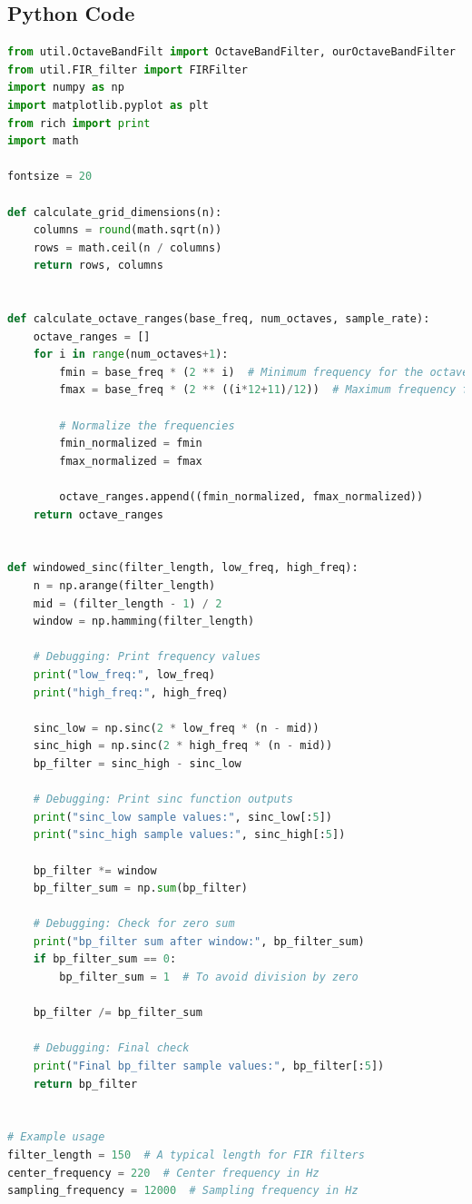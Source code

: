 \documentclass[a4paper, 11pt]{exam}
\begin{document}
\subsection{Python Code}
\begin{lstlisting}[language=Python]
from util.OctaveBandFilt import OctaveBandFilter, ourOctaveBandFilter
from util.FIR_filter import FIRFilter
import numpy as np
import matplotlib.pyplot as plt
from rich import print
import math

fontsize = 20

def calculate_grid_dimensions(n):
    columns = round(math.sqrt(n))
    rows = math.ceil(n / columns)
    return rows, columns


def calculate_octave_ranges(base_freq, num_octaves, sample_rate):
    octave_ranges = []
    for i in range(num_octaves+1):
        fmin = base_freq * (2 ** i)  # Minimum frequency for the octave
        fmax = base_freq * (2 ** ((i*12+11)/12))  # Maximum frequency for the octave

        # Normalize the frequencies
        fmin_normalized = fmin
        fmax_normalized = fmax

        octave_ranges.append((fmin_normalized, fmax_normalized))
    return octave_ranges


def windowed_sinc(filter_length, low_freq, high_freq):
    n = np.arange(filter_length)
    mid = (filter_length - 1) / 2
    window = np.hamming(filter_length)

    # Debugging: Print frequency values
    print("low_freq:", low_freq)
    print("high_freq:", high_freq)

    sinc_low = np.sinc(2 * low_freq * (n - mid))
    sinc_high = np.sinc(2 * high_freq * (n - mid))
    bp_filter = sinc_high - sinc_low

    # Debugging: Print sinc function outputs
    print("sinc_low sample values:", sinc_low[:5])
    print("sinc_high sample values:", sinc_high[:5])

    bp_filter *= window
    bp_filter_sum = np.sum(bp_filter)

    # Debugging: Check for zero sum
    print("bp_filter sum after window:", bp_filter_sum)
    if bp_filter_sum == 0:
        bp_filter_sum = 1  # To avoid division by zero

    bp_filter /= bp_filter_sum

    # Debugging: Final check
    print("Final bp_filter sample values:", bp_filter[:5])
    return bp_filter


# Example usage
filter_length = 150  # A typical length for FIR filters
center_frequency = 220  # Center frequency in Hz
sampling_frequency = 12000  # Sampling frequency in Hz


\end{lstlisting}
\end{document}
